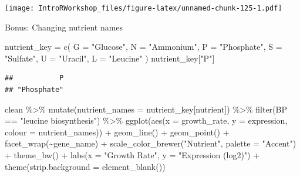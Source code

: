 \documentclass[
]{book}
\newenvironment{Shaded}{\begin{snugshade}}{\end{snugshade}}
\newcommand{\AttributeTok}[1]{\textcolor[rgb]{0.77,0.63,0.00}{#1}}
\newcommand{\FunctionTok}[1]{\textcolor[rgb]{0.00,0.00,0.00}{#1}}
\newcommand{\NormalTok}[1]{#1}
\newcommand{\OtherTok}[1]{\textcolor[rgb]{0.56,0.35,0.01}{#1}}
\newcommand{\SpecialCharTok}[1]{\textcolor[rgb]{0.00,0.00,0.00}{#1}}
\newcommand{\StringTok}[1]{\textcolor[rgb]{0.31,0.60,0.02}{#1}}
\begin{document}
\texttt{[image: IntroRWorkshop\_files/figure-latex/unnamed-chunk-125-1.pdf]}

Bonus: Changing nutrient names

\begin{Shaded}
\begin{Highlighting}[]
\NormalTok{nutrient\_key }\OtherTok{=} \FunctionTok{c}\NormalTok{(}
  \AttributeTok{G =} \StringTok{"Glucose"}\NormalTok{,}
  \AttributeTok{N =} \StringTok{"Ammonium"}\NormalTok{,}
  \AttributeTok{P =} \StringTok{"Phosphate"}\NormalTok{,}
  \AttributeTok{S =} \StringTok{"Sulfate"}\NormalTok{,}
  \AttributeTok{U =} \StringTok{"Uracil"}\NormalTok{,}
  \AttributeTok{L =} \StringTok{"Leucine"}
\NormalTok{)}
\NormalTok{nutrient\_key[}\StringTok{"P"}\NormalTok{]}
\end{Highlighting}
\end{Shaded}

\begin{verbatim}
##           P 
## "Phosphate"
\end{verbatim}

\begin{Shaded}
\begin{Highlighting}[]
\NormalTok{clean }\SpecialCharTok{\%\textgreater{}\%}
  \FunctionTok{mutate}\NormalTok{(}\AttributeTok{nutrient\_names =}\NormalTok{ nutrient\_key[nutrient]) }\SpecialCharTok{\%\textgreater{}\%}
    \FunctionTok{filter}\NormalTok{(BP }\SpecialCharTok{==} \StringTok{"leucine biosynthesis"}\NormalTok{) }\SpecialCharTok{\%\textgreater{}\%}
    \FunctionTok{ggplot}\NormalTok{(}\FunctionTok{aes}\NormalTok{(}\AttributeTok{x =}\NormalTok{ growth\_rate, }\AttributeTok{y =}\NormalTok{ expression, }\AttributeTok{colour =}\NormalTok{ nutrient\_names)) }\SpecialCharTok{+}
    \FunctionTok{geom\_line}\NormalTok{() }\SpecialCharTok{+}
    \FunctionTok{geom\_point}\NormalTok{() }\SpecialCharTok{+}
    \FunctionTok{facet\_wrap}\NormalTok{(}\SpecialCharTok{\textasciitilde{}}\NormalTok{gene\_name) }\SpecialCharTok{+}
    \FunctionTok{scale\_color\_brewer}\NormalTok{(}\StringTok{"Nutrient"}\NormalTok{, }\AttributeTok{palette =} \StringTok{"Accent"}\NormalTok{) }\SpecialCharTok{+}
    \FunctionTok{theme\_bw}\NormalTok{() }\SpecialCharTok{+}
    \FunctionTok{labs}\NormalTok{(}\AttributeTok{x =} \StringTok{"Growth Rate"}\NormalTok{, }\AttributeTok{y =} \StringTok{"Expression (log2)"}\NormalTok{) }\SpecialCharTok{+}
    \FunctionTok{theme}\NormalTok{(}\AttributeTok{strip.background =} \FunctionTok{element\_blank}\NormalTok{())}
\end{Highlighting}
\end{Shaded}
\end{document}

